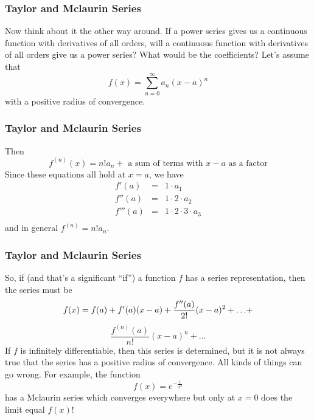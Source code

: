\documentclass[xcolor=dvipsnames]{beamer}
\begin{document}
\begin{frame}
  \frametitle{Taylor and Mclaurin Series}
  Now think about it the other way around. If a power series gives us
  a continuous function with derivatives of all orders, will a
  continuous function with derivatives of all orders give us a power
  series? What would be the coefficients? Let's assume that
  \begin{equation}
    \label{eq:jeepaipe}
    f(x)=\sum_{n=0}^{\infty}a_{n}(x-a)^{n}
  \end{equation}
  with a positive radius of convergence. 
\end{frame}

\begin{frame}
  \frametitle{Taylor and Mclaurin Series}
Then
  \begin{equation}
    \label{eq:itaivaeg}
    f^{(n)}(x)=n!a_{n}+\mbox{ a sum of terms with }x-a\mbox{ as a factor}
  \end{equation}
  Since these equations all hold at $x=a$, we have
  \begin{equation}
    \label{eq:ahthoazo}
    \begin{array}{rcl}
      f'(a)&=&1\cdot{}a_{1} \\
      f''(a)&=&1\cdot{}2\cdot{}a_{2} \\
      f'''(a)&=&1\cdot{}2\cdot{}3\cdot{}a_{3} \\
    \end{array}
  \end{equation}
    and in general $f^{(n)}=n!a_{n}$.
  \end{frame}

  \begin{frame}
    \frametitle{Taylor and Mclaurin Series}
    So, if (and that's a significant ``if'') a function $f$ has a
    series representation, then the series must be
    \begin{equation}
      \label{eq:ahazohve}
      f(x)=f(a)+f'(a)(x-a)+\frac{f''(a)}{2!}(x-a)^{2}+{\ldots}+\notag
    \end{equation}
    \begin{equation}
      \label{eq:oolietai}
      \frac{f^{(n)}(a)}{n!}(x-a)^{n}+{\ldots}
    \end{equation}
If $f$ is infinitely differentiable, then this series is determined,
but it is not always true that the series has a positive radius of
convergence. All kinds of things can go wrong. For example, the
function
\begin{equation}
  \label{eq:cutailae}
  f(x)=e^{-\frac{1}{x^{2}}}
\end{equation}
has a Mclaurin series which converges everywhere but only at $x=0$
does the limit equal $f(x)$!
  \end{frame}
\end{document}
